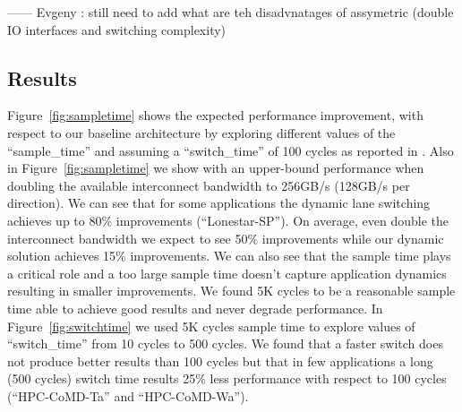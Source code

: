 ------  Evgeny : still need to add what are teh disadvnatages of assymetric
(double IO interfaces and switching complexity)



 \subsection{Results}
Figure~\ref{fig:sampletime} shows the expected performance improvement, with 
respect to our baseline architecture by exploring different values 
of the ``sample\_time'' and assuming a ``switch\_time'' of 100 cycles 
as reported in \cite{REALLY_NEED_REF_HERE}. Also in Figure~\ref{fig:sampletime}
we show with an upper-bound performance when doubling
the available interconnect bandwidth to 256GB/s (128GB/s per direction). 
We can see that for some applications the dynamic lane switching achieves up to
80\% improvements (``Lonestar-SP''). On average, even double the interconnect 
bandwidth we expect to see 50\% improvements while our dynamic solution 
achieves 15\% improvements. We can also see that the sample time plays a 
critical role and a too large sample time doesn't capture application dynamics 
resulting in smaller improvements. We found 5K cycles to be a reasonable sample
time able to achieve good results and never degrade performance. 
In Figure~\ref{fig:switchtime} we used 5K cycles sample time to
explore values of ``switch\_time'' from 10 cycles to 500 cycles.
We found that a faster switch does not produce better results than 100 cycles
but that in few applications a long (500 cycles) switch time results 25\% 
less performance with respect to 100 cycles (``HPC-CoMD-Ta'' and 
``HPC-CoMD-Wa'').









